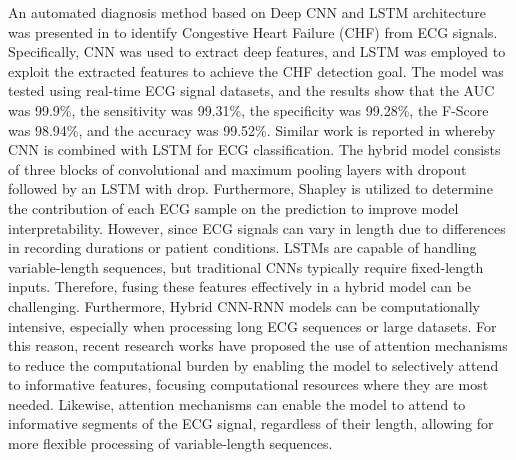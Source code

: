 \documentclass[preprint,12pt]{elsarticle}
\begin{document}
An automated diagnosis method based on Deep CNN and LSTM architecture was presented in \citep{kusuma_ecg_2022} to identify Congestive Heart Failure (CHF) from ECG signals. Specifically, CNN was used to extract deep features, and LSTM was employed to exploit the extracted features to achieve the CHF detection goal. The model was tested using real-time ECG signal datasets, and the results show that the AUC was 99.9\%, the sensitivity was 99.31\%, the specificity was 99.28\%, the F-Score was 98.94\%, and the accuracy was 99.52\%. Similar work is reported in \citep{alamatsaz_lightweight_2024} whereby CNN is combined with LSTM for ECG classification. The hybrid model consists of three blocks of convolutional and maximum pooling layers with dropout followed by an LSTM with drop. Furthermore, Shapley is utilized to determine the contribution of each ECG sample on the prediction to improve model interpretability. However, since ECG signals can vary in length due to differences in recording durations or patient conditions. LSTMs are capable of handling variable-length sequences, but traditional CNNs typically require fixed-length inputs. Therefore, fusing these features effectively in a hybrid model can be challenging. Furthermore, Hybrid CNN-RNN models can be computationally intensive, especially when processing long ECG sequences or large datasets. For this reason, recent research works have proposed the use of attention mechanisms to reduce the computational burden by enabling the model to selectively attend to informative features, focusing computational resources where they are most needed. Likewise, attention mechanisms can enable the model to attend to informative segments of the ECG signal, regardless of their length, allowing for more flexible processing of variable-length sequences. 
\end{document}
